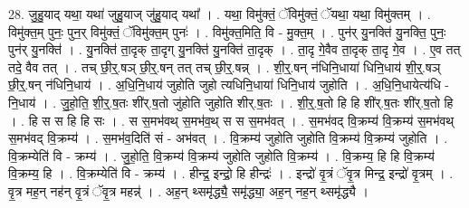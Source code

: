 \documentclass[17pt]{extarticle}
\begin{document}
28. जु॒हु॒याद् यथा॒ यथा॑ जुहु॒याज् जु॑हु॒याद् यथा᳚ । . यथा॒ विमु॑क्तं॒ ॅविमु॑क्तं॒ ॅयथा॒ यथा॒ विमु॑क्तम् । . विमु॑क्त॒म् पुनः॒ पुन॒र् विमु॑क्तं॒ ॅविमु॑क्त॒म् पुनः॑ । . विमु॑क्त॒मिति॒ वि - मु॒क्त॒म् । . पुन॑र् यु॒नक्ति॑ यु॒नक्ति॒ पुनः॒ पुन॑र् यु॒नक्ति॑ । . यु॒नक्ति॑ ता॒दृक् ता॒दृग् यु॒नक्ति॑ यु॒नक्ति॑ ता॒दृक् । . ता॒दृ गे॒वैव ता॒दृक् ता॒दृ गे॒व । . ए॒व तत् तदे॒ वैव तत् । . तच् छी॒र्॒.षञ् छी॒र्॒.षन् तत् तच् छी॒र्॒.षन्न् । . शी॒र्॒.षन् न॑धिनि॒धाया॑ धिनि॒धाय॑ शी॒र्॒.षञ् छी॒र्॒.षन् न॑धिनि॒धाय॑ । . अ॒धि॒नि॒धाय॑ जुहोति जुहो त्यधिनि॒धाया॑ धिनि॒धाय॑ जुहोति । . अ॒धि॒नि॒धायेत्य॑धि - नि॒धाय॑ । . जु॒हो॒ति॒ शी॒र्॒.ष॒तः शी॑र्.ष॒तो जु॑होति जुहोति शीर्.ष॒तः । . शी॒र्॒.ष॒तो हि हि शी॑र्.ष॒तः शी॑र्.ष॒तो हि । . हि स स हि हि सः । . स स॒मभ॑वथ् स॒मभ॑व॒थ् स स स॒मभ॑वत् । . स॒मभ॑वद् वि॒क्रम्य॑ वि॒क्रम्य॑ स॒मभ॑वथ् स॒मभ॑वद् वि॒क्रम्य॑ । . स॒मभ॑व॒दिति॑ सं - अभ॑वत् । . वि॒क्रम्य॑ जुहोति जुहोति वि॒क्रम्य॑ वि॒क्रम्य॑ जुहोति । . वि॒क्रम्येति॑ वि - क्रम्य॑ । . जु॒हो॒ति॒ वि॒क्रम्य॑ वि॒क्रम्य॑ जुहोति जुहोति वि॒क्रम्य॑ । . वि॒क्रम्य॒ हि हि वि॒क्रम्य॑ वि॒क्रम्य॒ हि । . वि॒क्रम्येति॑ वि - क्रम्य॑ । . हीन्द्र॒ इन्द्रो॒ हि हीन्द्रः॑ । . इन्द्रो॑ वृ॒त्रं ॅवृ॒त्र मिन्द्र॒ इन्द्रो॑ वृ॒त्रम् । . वृ॒त्र मह॒न् नह॑न् वृ॒त्रं ॅवृ॒त्र महन्न्॑ । . अह॒न् थ्समृ॑द्ध्यै॒ समृ॑द्ध्या॒ अह॒न् नह॒न् थ्समृ॑द्ध्यै । \newline
\end{document}
